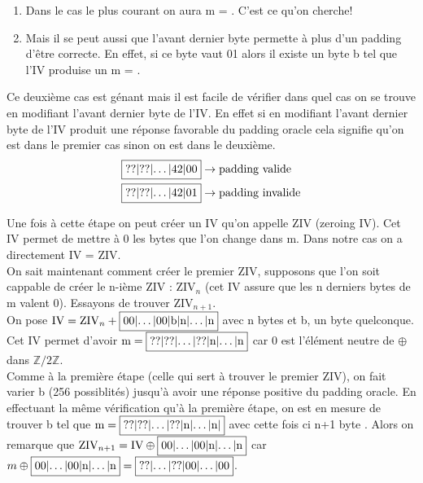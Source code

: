 \documentclass[a4paper, 12pt]{article}
\begin{document}
\begin{enumerate}
	\item Dans le cas le plus courant on aura m = . C'est ce qu'on cherche!
	\item Mais il se peut aussi que l'avant dernier byte permette à plus d'un padding d'être correcte. En effet, si ce byte vaut 01 alors il existe un byte b tel que l'IV produise un m = .
\end{enumerate}

Ce deuxième cas est génant mais il est facile de vérifier dans quel cas on se trouve en modifiant l'avant dernier byte de l'IV.
En effet si en modifiant l'avant dernier byte de l'IV produit une réponse favorable du padding oracle cela signifie qu'on est dans le premier cas sinon on est dans le deuxième. 
\begin{align*}
	&\fbox{??|??|$\dots$|42|00} \rightarrow \text{padding valide}\\
	&\fbox{??|??|$\dots$|42|01} \rightarrow \text{padding invalide}
\end{align*}

Une fois à cette étape on peut créer un IV qu'on appelle ZIV (zeroing IV). Cet IV permet de mettre à 0 les bytes que l'on change dans m. Dans notre cas on a directement IV = ZIV. \\

On sait maintenant comment créer le premier ZIV, supposons que l'on soit cappable de créer le n-ième ZIV : $\text{ZIV}_n$ (cet IV assure que les n derniers bytes de m valent 0). Essayons de trouver $\text{ZIV}_{n+1}$. \\

On pose $\text{IV} = \text{ZIV}_n + \fbox{00|$\dots$|00|b|n|$\dots$|n}$ avec n bytes  et b, un byte quelconque. Cet IV permet d'avoir $\text{m} = \fbox{??|??|\dots|??|n|$\dots$|n}$ car 0 est l'élément neutre de $\oplus$ dans $\mathbb{Z}/2\mathbb{Z}$. \\
Comme à la première étape (celle qui sert à trouver le premier ZIV), on fait varier b (256 possiblités) jusqu'à avoir une réponse positive du padding oracle. En effectuant la même vérification qu'à la première étape, on est en mesure de trouver b tel que $\text{m} = \fbox{??|??|$\dots$|??|n|$\dots$|n|}$ avec cette fois ci n+1 byte . Alors on remarque que $\text{ZIV}_{n+1} = \text{IV} \oplus \fbox{00|$\dots$|00|n|$\dots$|n}$ car $m \oplus \fbox{00|$\dots$|00|n|$\dots$|n} = \fbox{??|$\dots$|??|00|$\dots$|00}$. \\
\end{document}
